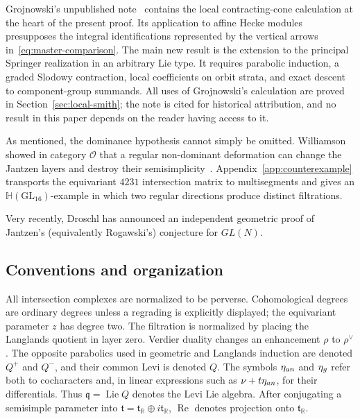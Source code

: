 \documentclass[10pt,a4paper]{amsart}
\newcommand{\Hh}{\mathbb H}
\begin{document}
Grojnowski's unpublished note~\cite{GrojnowskiJantzen} contains the local
contracting-cone calculation at the heart of the present proof.  Its
application to affine Hecke modules presupposes the integral identifications
represented by the vertical arrows in~\eqref{eq:master-comparison}.  The main
new result is the extension to the principal Springer realization in an arbitrary 
Lie type.  It
requires parabolic induction, a graded Slodowy
contraction, local coefficients on orbit strata, and exact descent to
component-group summands.
All uses of Grojnowski's calculation are proved in
Section~\ref{sec:local-smith}; the note is
cited for historical attribution, and no result in this paper depends on the
reader having access to it.

\smallskip

As mentioned, the dominance hypothesis cannot simply be omitted.  Williamson showed in
category $\mathcal O$ that a regular non-dominant deformation can change the
Jantzen layers and destroy their
semisimplicity~\cite[Sections~1.6 and~8.4]{WilliamsonLocal}.
Appendix~\ref{app:counterexample} transports the equivariant $4231$
intersection matrix to multisegments and gives an $\Hh(\mathrm{GL}_{16})$-example in which two regular directions produce distinct
filtrations.

\smallskip

Very recently, Droschl \cite{Dro} has announced an independent geometric proof of Jantzen's (equivalently Rogawski's) conjecture for $GL(N)$.

\subsection*{Conventions and organization}

All intersection complexes are normalized to be perverse.  Cohomological
degrees are ordinary degrees unless a regrading is explicitly displayed; the
equivariant parameter $z$ has degree two.  The filtration is normalized by
placing the Langlands quotient in layer zero.  Verdier duality changes an
enhancement $\rho$ to $\rho^\vee$.  The opposite parabolics used in geometric
and Langlands induction are denoted $Q^+$ and $Q^-$, and their common Levi is
denoted $Q$.  The symbols $\eta_{\rm an}$ and $\eta_{\rm g}$ refer both to cocharacters and,
in linear expressions such as $\nu+t\eta_{\rm an}$, for their differentials.
Thus $\mathfrak q=\operatorname{Lie}Q$ denotes the Levi Lie algebra.  After conjugating a semisimple
parameter into
$\mathfrak t=\mathfrak t_{\mathbb R}\oplus i\mathfrak t_{\mathbb R}$,
$\operatorname{Re}$ denotes projection onto
$\mathfrak t_{\mathbb R}$.
\end{document}
